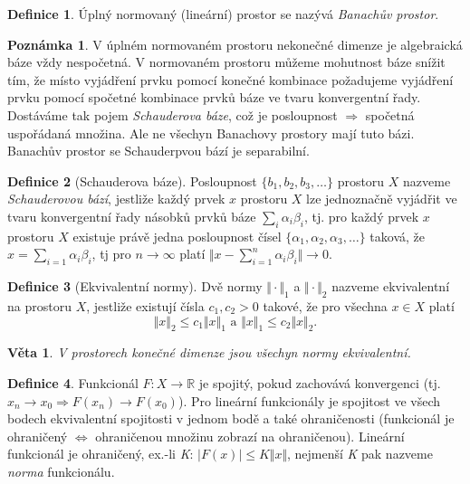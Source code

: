 \documentclass[a4]{report}
\newtheorem{theorem}{Věta}
\theoremstyle{definition}
\newtheorem{definition}{Definice}[section]
\newtheorem{notes}{Poznámka}[section]
\begin{document}
{\begin{definition}
Úplný normovaný (lineární) prostor se nazývá \textit{Banachův prostor}. 
\end{definition}

\begin{notes}

	V úplném normovaném prostoru nekonečné dimenze je algebraická báze vždy nespočetná. V normovaném prostoru můžeme mohutnost báze snížit tím, že místo vyjádření prvku pomocí konečné kombinace požadujeme vyjádření prvku pomocí spočetné kombinace prvků báze ve tvaru konvergentní řady. Dostáváme tak pojem \textit{Schauderova báze}, což je posloupnost $\Rightarrow$  spočetná uspořádaná množina. Ale ne všechyn Banachovy prostory mají tuto bázi. Banachův prostor se Schauderpvou bází je separabilní. 
\end{notes}

\begin{definition}[Schauderova báze]
Posloupnost $\{b_1,b_2,b_3,\ldots \}$ prostoru $X$ nazveme \textit{Schauderovou bází}, jestliže každý prvek $x$ prostoru $X$ lze jednoznačně vyjádřit ve tvaru konvergentní řady násobků prvků báze $\sum_i \alpha_i\beta_i$, tj.  pro každý prvek $x$ prostoru $X$ existuje právě jedna posloupnost čísel $\{\alpha_1,\alpha_2,\alpha_3,\ldots\}$ taková, že $x=\sum_{i=1} \alpha_i\beta_i$, tj pro $n\rightarrow \infty$ platí $\Vert x-\sum_{i=1}^n  \alpha_i\beta_i \Vert \rightarrow 0.$	
\end{definition}
\begin{definition}[Ekvivalentní normy] 
Dvě normy $\Vert \cdot \Vert_1 $ a $\Vert \cdot \Vert_2$ nazveme ekvivalentní na prostoru $X$, jestliže existují čísla $c_1,c_2>0 $ takové, že pro všechna $x\in X$ platí \begin{equation*}
	\Vert x \Vert_2 \leq c_1 \Vert x\Vert_1 \text{    a    } \Vert x \Vert_1 \leq c_2 \Vert x\Vert_2.
\end{equation*}
	
\begin{theorem}
	V prostorech konečné dimenze jsou všechyn normy ekvivalentní.
\end{theorem}

\end{definition}
\begin{definition}
Funkcionál $F : X \rightarrow \mathbb{R}$ je spojitý, pokud zachovává konvergenci (tj. $x_n \rightarrow x_0 \Rightarrow F(x_n) \rightarrow F(x_0)$). Pro lineární funkcionály je spojitost ve všech bodech ekvivalentní spojitosti v jednom bodě a také ohraničenosti (funkcionál je ohraničený $ \Leftrightarrow $ ohraničenou množinu zobrazí na ohraničenou). Lineární funkcionál je ohraničený, ex.-li \textit{K}: $ \vert F(x) \vert \leq K \Vert x \Vert$, nejmenší \textit{K} pak nazveme \textit{norma} funkcionálu.
\end{definition}

}
\end{document}
